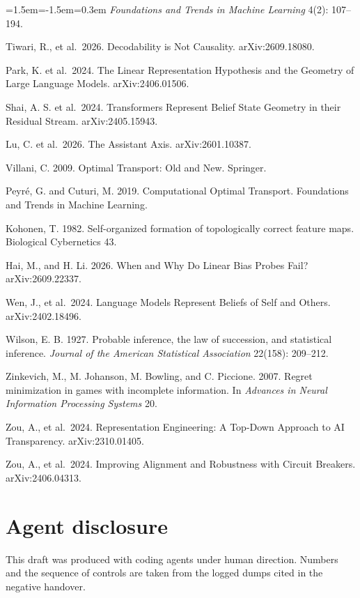 \documentclass[11pt,a4paper]{article}
\begin{document}
\begin{list}{}{\leftmargin=1.5em\itemindent=-1.5em\itemsep=0.3em}
\emph{Foundations and Trends in Machine Learning} 4(2): 107--194.
\item Tiwari, R., et al.~2026. Decodability is Not Causality.
arXiv:2609.18080.
\item Park, K. et al.~2024. The Linear Representation Hypothesis and the
Geometry of Large Language Models. arXiv:2406.01506.
\item Shai, A. S. et al.~2024. Transformers Represent Belief State Geometry in
their Residual Stream. arXiv:2405.15943.
\item Lu, C. et al.~2026. The Assistant Axis. arXiv:2601.10387.
\item Villani, C. 2009. Optimal Transport: Old and New. Springer.
\item Peyré, G. and Cuturi, M. 2019. Computational Optimal Transport.
Foundations and Trends in Machine Learning.
\item Kohonen, T. 1982. Self-organized formation of topologically correct
feature maps. Biological Cybernetics 43.
\item Hai, M., and H. Li. 2026. When and Why Do Linear Bias Probes Fail?
arXiv:2609.22337.
\item Wen, J., et al.~2024. Language Models Represent Beliefs of Self and
Others. arXiv:2402.18496.
\item Wilson, E. B. 1927. Probable inference, the law of succession, and
statistical inference. \emph{Journal of the American Statistical
Association} 22(158): 209--212.
\item Zinkevich, M., M. Johanson, M. Bowling, and C. Piccione. 2007. Regret
minimization in games with incomplete information. In \emph{Advances in
Neural Information Processing Systems} 20.
\item Zou, A., et al.~2024. Representation Engineering: A Top-Down Approach to
AI Transparency. arXiv:2310.01405.
\item Zou, A., et al.~2024. Improving Alignment and Robustness with Circuit
Breakers. arXiv:2406.04313.
\end{list}
\section*{Agent disclosure}
This draft was produced with coding agents under human direction.
Numbers and the sequence of controls are taken from the logged dumps
cited in the negative handover.
\end{document}
